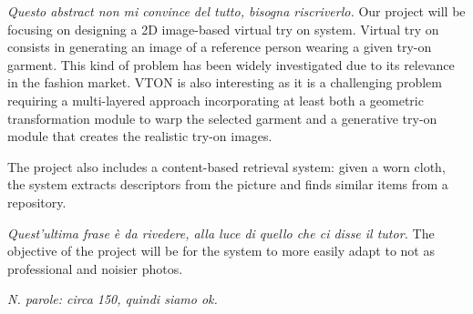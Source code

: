\textit{Questo abstract non mi convince del tutto, bisogna riscriverlo.}
Our project will be focusing on designing a 2D image-based virtual try on system. Virtual try on consists in generating an image of a reference person wearing a given try-on garment. This kind of problem has been widely investigated due to its relevance in the fashion market. VTON is also interesting as it is a challenging problem requiring a multi-layered approach incorporating at least both a geometric transformation module to warp the selected garment and a generative try-on module that creates the realistic try-on images.

The project also includes a content-based retrieval system: given a worn cloth, the system extracts descriptors from the picture and finds similar items from a repository.

\textit{Quest'ultima frase è da rivedere, alla luce di quello che ci disse il tutor.}
The objective of the project will be for the system to more easily adapt to not as professional and noisier photos.

\textit{N. parole: circa 150, quindi siamo ok.}
